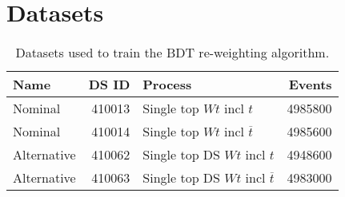 \chapter{Datasets}%
\label{app:datasets}

\begin{table}[ht]
  \centering
  \begin{tabular}{lrlr}
    \toprule
    Name & DS ID & Process & Events \\ [0.5ex] 
    \midrule
    Nominal     & 410013 & Single top $Wt$ incl $t$               & 4985800 \\
    Nominal     & 410014 & Single top $Wt$ incl $\overline{t}$    & 4985600 \\
    Alternative & 410062 & Single top DS $Wt$ incl $t$            & 4948600 \\
    Alternative & 410063 & Single top DS $Wt$ incl $\overline{t}$ & 4983000 \\
    \bottomrule
  \end{tabular}
  \caption{Datasets used to train the BDT re-weighting algorithm.}%
  \label{tab:data}
\end{table}
